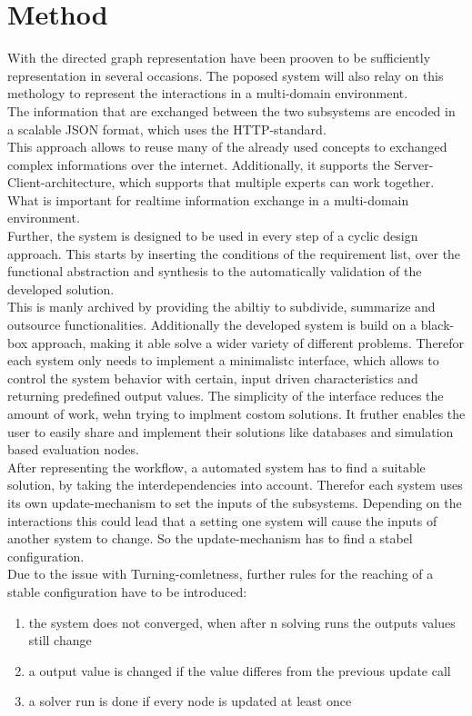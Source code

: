 \section{Method}
With the directed graph representation have been prooven to be 
sufficiently representation in several occasions.
The poposed system will also relay on this methology 
to represent the interactions in a multi-domain environment.\\
The information that are exchanged between the two subsystems
are encoded in a scalable JSON format, which uses the HTTP-standard.\\
This approach allows to reuse many of the already used concepts to exchanged complex informations over the internet.
Additionally, it supports the Server-Client-architecture, which supports that multiple experts can work together.
What is important for realtime information exchange in a multi-domain environment.\\
Further, the system is designed to be used in every step of a cyclic design approach.
This starts by inserting the conditions of the requirement list, 
over the functional abstraction and synthesis to the automatically validation of the developed solution.\\
This is manly archived by providing the abiltiy to subdivide, summarize and outsource functionalities. 
Additionally the developed system is build on a black-box approach, making it able solve a wider variety of different problems.
Therefor each system only needs to implement a minimalistc interface, 
which allows to control the system behavior with certain, input driven characteristics and returning predefined output values.
The simplicity of the interface reduces the amount of work, wehn trying to implment costom solutions.
It fruther enables the user to easily share and implement their solutions like databases and simulation based evaluation nodes.\\
After representing the workflow, a automated system has to find a suitable solution, by taking the interdependencies into account.
Therefor each system uses its own update-mechanism to set the inputs of the subsystems.
Depending on the interactions this could lead that a setting one system will cause the inputs of another system to change.
So the update-mechanism has to find a stabel configuration.\\
Due to the issue with Turning-comletness, 
further rules for the reaching of a stable configuration have to be introduced:
\begin{enumerate}
    \item the system does not converged, when after n solving runs the outputs values still change
    \item a output value is changed if the value differes from the previous update call
    \item a solver run is done if every node is updated at least once
\end{enumerate}
